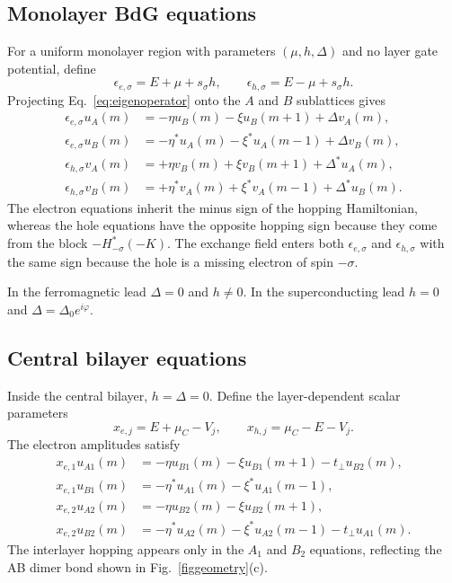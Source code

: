 \subsection{Monolayer BdG equations}
\label{subsec:monolayer-bdg-equations}

For a uniform monolayer region with parameters $(\mu,h,\Delta)$ and no layer gate potential, define
\begin{equation}
    \epsilon_{e,\sigma}=E+\mu+s_\sigma h,
    \qquad
    \epsilon_{h,\sigma}=E-\mu+s_\sigma h.
    \label{eq:eps-eh}
\end{equation}
Projecting Eq.~\eqref{eq:eigenoperator} onto the $A$ and $B$ sublattices gives
\begin{align}
    \epsilon_{e,\sigma}u_A(m)
    &=
    -\eta u_B(m)-\xi u_B(m+1)+\Delta v_A(m),
    \label{eq:mono-eA}\\
    \epsilon_{e,\sigma}u_B(m)
    &=
    -\eta^*u_A(m)-\xi^*u_A(m-1)+\Delta v_B(m),
    \label{eq:mono-eB}\\
    \epsilon_{h,\sigma}v_A(m)
    &=
    +\eta v_B(m)+\xi v_B(m+1)+\Delta^*u_A(m),
    \label{eq:mono-hA}\\
    \epsilon_{h,\sigma}v_B(m)
    &=
    +\eta^*v_A(m)+\xi^*v_A(m-1)+\Delta^*u_B(m).
    \label{eq:mono-hB}
\end{align}
The electron equations inherit the minus sign of the hopping Hamiltonian, whereas the hole equations have the opposite hopping sign because they come from the block $-H^*_{-\sigma}(-K)$.  The exchange field enters both $\epsilon_{e,\sigma}$ and $\epsilon_{h,\sigma}$ with the same sign because the hole is a missing electron of spin $-\sigma$.

In the ferromagnetic lead $\Delta=0$ and $h\ne0$.  In the superconducting lead $h=0$ and $\Delta=\Delta_0e^{i\varphi}$.

\subsection{Central bilayer equations}
\label{subsec:central-bilayer-equations}

Inside the central bilayer, $h=\Delta=0$.  Define the layer-dependent scalar parameters
\begin{equation}
    x_{e,j}=E+\mu_C-V_j,
    \qquad
    x_{h,j}=\mu_C-E-V_j.
    \label{eq:central-xe-xh}
\end{equation}
The electron amplitudes satisfy
\begin{align}
    x_{e,1}u_{A1}(m)
    &=
    -\eta u_{B1}(m)-\xi u_{B1}(m+1)-t_\perp u_{B2}(m),
    \label{eq:bilayer-eA1}\\
    x_{e,1}u_{B1}(m)
    &=
    -\eta^*u_{A1}(m)-\xi^*u_{A1}(m-1),
    \label{eq:bilayer-eB1}\\
    x_{e,2}u_{A2}(m)
    &=
    -\eta u_{B2}(m)-\xi u_{B2}(m+1),
    \label{eq:bilayer-eA2}\\
    x_{e,2}u_{B2}(m)
    &=
    -\eta^*u_{A2}(m)-\xi^*u_{A2}(m-1)-t_\perp u_{A1}(m).
    \label{eq:bilayer-eB2}
\end{align}
The interlayer hopping appears only in the $A_1$ and $B_2$ equations, reflecting the AB dimer bond shown in Fig.~\ref{figgeometry}(c).

